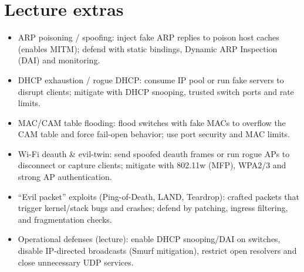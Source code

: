 \documentclass[12pt]{article}
\begin{document}
\section{Lecture extras}
\begin{itemize}
  \item ARP poisoning / spoofing: inject fake ARP replies to poison host caches (enables MITM); defend with static bindings, Dynamic ARP Inspection (DAI) and monitoring.
  \item DHCP exhaustion / rogue DHCP: consume IP pool or run fake servers to disrupt clients; mitigate with DHCP snooping, trusted switch ports and rate limits.
  \item MAC/CAM table flooding: flood switches with fake MACs to overflow the CAM table and force fail-open behavior; use port security and MAC limits.
  \item Wi-Fi deauth \& evil-twin: send spoofed deauth frames or run rogue APs to disconnect or capture clients; mitigate with 802.11w (MFP), WPA2/3 and strong AP authentication.
  \item ``Evil packet'' exploits (Ping-of-Death, LAND, Teardrop): crafted packets that trigger kernel/stack bugs and crashes; defend by patching, ingress filtering, and fragmentation checks.
  \item Operational defenses (lecture): enable DHCP snooping/DAI on switches, disable IP-directed broadcasts (Smurf mitigation), restrict open resolvers and close unnecessary UDP services.
\end{itemize}

\clearpage
{}
{}
\printindex
\end{document}
